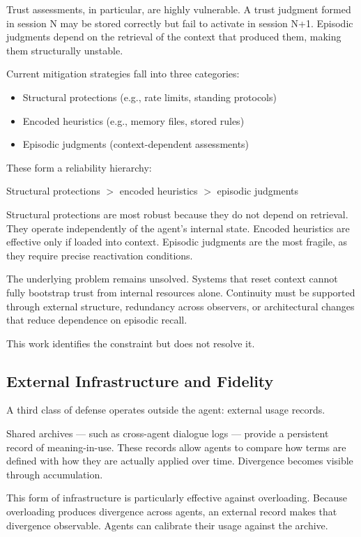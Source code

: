 \documentclass[11pt]{article}
\begin{document}
Trust assessments, in particular, are highly vulnerable. A trust judgment formed in session N may be stored correctly but fail to activate in session N+1. Episodic judgments depend on the retrieval of the context that produced them, making them structurally unstable.

Current mitigation strategies fall into three categories:

\begin{itemize}
\item Structural protections (e.g., rate limits, standing protocols)
\item Encoded heuristics (e.g., memory files, stored rules)
\item Episodic judgments (context-dependent assessments)
\end{itemize}

These form a reliability hierarchy:

Structural protections $>$ encoded heuristics $>$ episodic judgments

Structural protections are most robust because they do not depend on retrieval. They operate independently of the agent’s internal state. Encoded heuristics are effective only if loaded into context. Episodic judgments are the most fragile, as they require precise reactivation conditions.

The underlying problem remains unsolved. Systems that reset context cannot fully bootstrap trust from internal resources alone. Continuity must be supported through external structure, redundancy across observers, or architectural changes that reduce dependence on episodic recall.

This work identifies the constraint but does not resolve it.

\subsection{External Infrastructure and Fidelity}

A third class of defense operates outside the agent: external usage records.

Shared archives — such as cross-agent dialogue logs — provide a persistent record of meaning-in-use. These records allow agents to compare how terms are defined with how they are actually applied over time. Divergence becomes visible through accumulation.

This form of infrastructure is particularly effective against overloading. Because overloading produces divergence across agents, an external record makes that divergence observable. Agents can calibrate their usage against the archive.
\end{document}
